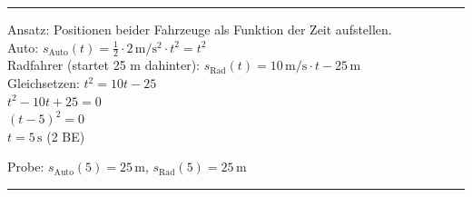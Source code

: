 \documentclass[11pt,a4paper]{article}
\newcounter{aufgabe}
\newcommand{\lsg}[1]{\textcolor{correct}{#1}}
\newcommand{\be}[1]{\hfill\textcolor{correct}{\small(#1 BE)}}
\begin{document}
\vspace{0.3cm}
\hrule
\vspace{0.3cm}

\noindent{}

\vspace{0.3cm}

\lsg{Ansatz: Positionen beider Fahrzeuge als Funktion der Zeit aufstellen.}\\[0.2cm]
\lsg{Auto: $s_{\text{Auto}}(t) = \frac{1}{2} \cdot 2\,\mathrm{m/s^2} \cdot t^2 = t^2$}\\
\lsg{Radfahrer (startet 25 m dahinter): $s_{\text{Rad}}(t) = 10\,\mathrm{m/s} \cdot t - 25\,\mathrm{m}$}\\[0.2cm]
\lsg{Gleichsetzen: $t^2 = 10t - 25$}\\
\lsg{$t^2 - 10t + 25 = 0$}\\
\lsg{$(t - 5)^2 = 0$}\\
\lsg{$t = 5\,\mathrm{s}$} \be{2}

{\small\color{correct} Probe: $s_{\text{Auto}}(5) = 25\,\mathrm{m}$, $s_{\text{Rad}}(5) = 25\,\mathrm{m}$ \checkmark}

\vspace{0.3cm}
\hrule
\vspace{0.3cm}

\begin{center}
\end{center}
\end{document}

